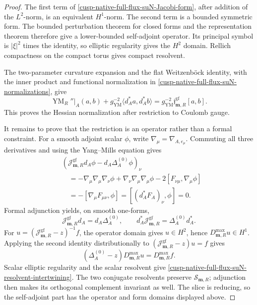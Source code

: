 \begin{proof}
The first term of
\cref{cusp-native-full-flux-suN-Jacobi-form}, after addition of the
\(L^2\)-norm, is an equivalent \(H^1\)-norm.  The second term is a bounded
symmetric form.  The bounded perturbation theorem for closed forms and the
representation theorem therefore give a lower-bounded self-adjoint
operator.  Its principal symbol is \(|\xi|^2\) times the identity, so
elliptic regularity gives the \(H^2\) domain.  Rellich compactness on the
compact torus gives compact resolvent.

The two-parameter curvature expansion and the flat Weitzenb\"ock identity,
with the inner product and functional normalization in
\cref{cusp-native-full-flux-suN-normalizations}, give
\[
 \operatorname{YM}_R''\big|_A(a,b)
 +g_{\mathrm{YM}}^{-2}\langle d_A^*a,d_A^*b\rangle
 =g_{\mathrm{YM}}^{-2}
   \mathfrak j_{\mathbf m,R}^{\mathrm{gf}}[a,b].
\]
This proves the Hessian normalization after restriction to Coulomb gauge.

It remains to prove that the restriction is an operator rather than a formal
constraint.  For a smooth adjoint scalar \(\phi\), write
\(\nabla_\mu=\nabla_{A,e_\mu}\).  Commuting all three derivatives and using
the Yang--Mills equation gives
\begin{align*}
 &(\mathcal J_{\mathbf m,R}^{\mathrm{gf}}d_A\phi
       -d_A\Delta_A^{(0)}\phi)_\nu\\
 &\quad=-\nabla_\mu\nabla_\mu\nabla_\nu\phi
       +\nabla_\nu\nabla_\mu\nabla_\mu\phi
       -2[F_{\nu\mu},\nabla_\mu\phi]\\
 &\quad=-[\nabla_\mu F_{\mu\nu},\phi]
       =[(d_A^*F_A)_\nu,\phi]=0.
\end{align*}
Formal adjunction yields, on smooth one-forms,
\begin{equation}
 \mathcal J_{\mathbf m,R}^{\mathrm{gf}}d_A
 =d_A\Delta_A^{(0)},
 \qquad
 d_A^*\mathcal J_{\mathbf m,R}^{\mathrm{gf}}
 =\Delta_A^{(0)}d_A^*.
 \label{cusp-native-full-flux-suN-formal-intertwining}
\end{equation}
For
\(u=(\mathcal J_{\mathbf m,R}^{\mathrm{gf}}-z)^{-1}f\), the operator domain
gives \(u\in H^2\), hence \(D_{\mathbf m,R}^{\max}u\in H^1\).  Applying the
second identity distributionally to
\((\mathcal J_{\mathbf m,R}^{\mathrm{gf}}-z)u=f\) gives
\[
 (\Delta_A^{(0)}-z)D_{\mathbf m,R}^{\max}u
 =D_{\mathbf m,R}^{\max}f.
\]
Scalar elliptic regularity and the scalar resolvent give
\cref{cusp-native-full-flux-suN-resolvent-intertwining}.  The two conjugate
resolvents preserve \(\mathscr S_{\mathbf m,R}\); adjunction then makes its
orthogonal complement invariant as well.  The slice is reducing, so the
self-adjoint part has the operator and form domains displayed above.
\end{proof}

